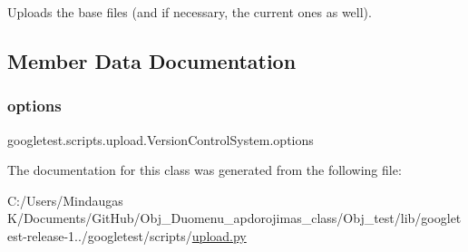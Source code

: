 \begin{DoxyVerb}Uploads the base files (and if necessary, the current ones as well).\end{DoxyVerb}
 

\subsection{Member Data Documentation}
\mbox{\label{classgoogletest_1_1scripts_1_1upload_1_1_version_control_system_abd30c66b6c5c39c14df9a1fa4ffac67b}} 
\subsubsection{\texorpdfstring{options}{options}}
{\footnotesize\ttfamily googletest.\+scripts.\+upload.\+Version\+Control\+System.\+options}



The documentation for this class was generated from the following file\+:\begin{DoxyCompactItemize}
\item 
C\+:/\+Users/\+Mindaugas K/\+Documents/\+Git\+Hub/\+Obj\+\_\+\+Duomenu\+\_\+apdorojimas\+\_\+class/\+Obj\+\_\+test/lib/googletest-\/release-\/1../googletest/scripts/\mbox{\hyperlink{_obj__test_2lib_2googletest-release-1_88_81_2googletest_2scripts_2upload_8py}{upload.\+py}}\end{DoxyCompactItemize}
